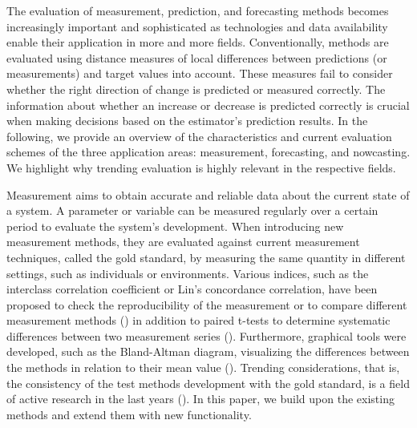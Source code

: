 The evaluation of measurement, prediction, and forecasting methods becomes increasingly important and sophisticated as technologies and data availability enable their application in more and more fields. 
Conventionally, methods are evaluated using distance measures of local differences between predictions (or measurements) and target values into account. 
These measures fail to consider whether the right direction of change is predicted or measured correctly.
The information about whether an increase or decrease is predicted correctly is crucial when making decisions based on the estimator's prediction results. 
In the following, we provide an overview of the characteristics and current evaluation schemes of the three application areas: measurement, forecasting, and nowcasting.
We highlight why trending evaluation is highly relevant in the respective fields.

Measurement aims to obtain accurate and reliable data about the current state of a system. 
A parameter or variable can be measured regularly over a certain period to evaluate the system's development.
When introducing new measurement methods, they are evaluated against current measurement techniques, called the gold standard, by measuring the same quantity in different settings, such as individuals or environments.
Various indices, such as the interclass correlation coefficient or Lin's concordance correlation, have been proposed to check the reproducibility of the measurement or to compare different measurement methods (\cite{lawrence1989concordance,koo2016guideline}) in addition to paired t-tests to determine systematic differences between two measurement series (\cite{watson2010method}). 
Furthermore, graphical tools were developed, such as the Bland-Altman diagram, visualizing the differences between the methods in relation to their mean value (\cite{bland1986statistical}). 
Trending considerations, that is, the consistency of the test methods development with the gold standard, is a field of active research in the last years (\cite{Saugel2015,saugel2018error,hiraishi2021concordance}). 
In this paper, we build upon the existing methods and extend them with new functionality.

